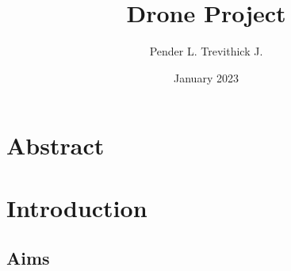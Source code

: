\documentclass{article}
\begin{document}
\title{Drone Project}
\author{Pender L. Trevithick J.}
\date{January 2023}
\maketitle

\section{Abstract}

\section{Introduction}


\subsection{Aims}
\end{document}
